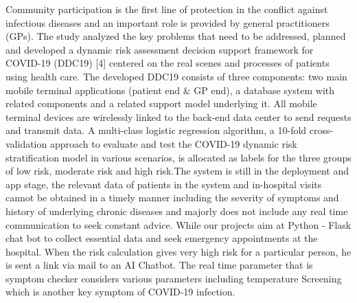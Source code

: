 \documentclass[12pt]{article}
\begin{document}
\begin{justify}
Community participation is the first line of protection in the conflict against infectious diseases and an important role is provided by general practitioners (GPs). The study analyzed the key problems that need to be addressed, planned and developed a dynamic risk assessment decision support framework for COVID-19 (DDC19) [4] centered on the real scenes and processes of patients using health care. The developed DDC19 consists of three components: two main mobile terminal applications (patient end $\&$  GP end), a database system with related components and a related support model underlying it. All mobile terminal devices are wirelessly linked to the back-end data center to send requests and transmit data. A multi-class logistic regression algorithm, a 10-fold cross-validation approach to evaluate and test the COVID-19 dynamic risk stratification model in various scenarios, is allocated as labels for the three groups of low risk, moderate risk and high risk.The system is still in the deployment and app stage, the relevant data of patients in the system and in-hospital visits cannot be obtained in a timely manner including the severity of symptoms and history of underlying chronic diseases and majorly does not include any real time communication to seek constant advice. While our projects aim at Python - Flask chat bot to collect essential data and seek emergency appointments at the hospital. When the risk calculation gives very high risk for a particular person, he is sent a link via mail to an AI Chatbot. The real time parameter that is symptom checker considers various parameters including temperature Screening which is another key symptom of COVID-19 infection.
\end{justify}

\vspace{\baselineskip}
\setlength{\parskip}{9.96pt}

\vspace{\baselineskip}

\vspace{\baselineskip}

\vspace{\baselineskip}

\vspace{\baselineskip}

\vspace{\baselineskip}

\vspace{\baselineskip}
\vspace{\baselineskip}
\vspace{\baselineskip}
\vspace{\baselineskip}
\vspace{\baselineskip}
\vspace{\baselineskip}
\vspace{\baselineskip}
\vspace{\baselineskip}
\vspace{\baselineskip}
\vspace{\baselineskip}
\vspace{\baselineskip}
\vspace{\baselineskip}
\end{document}
